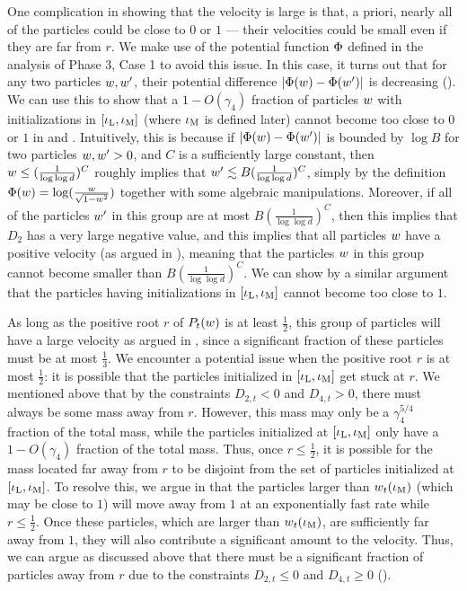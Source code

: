 One complication in showing that the velocity is large is that, a priori, nearly all of the particles could be close to $0$ or $1$ --- their velocities could be small even if they are far from $r$. We make use of the potential function $\Phi$ defined in the analysis of Phase 3, Case 1 to avoid this issue. In this case, it turns out that for any two particles $w, w'$, their potential difference $|\Phi(w) - \Phi(w')|$ is decreasing (). We can use this to show that a $1 - O(\gamma_4)$ fraction of particles $w$ with initializations in $[\iota_{\textup{L}}, \iota_{\textup{M}}]$ (where $\iota_{\textup{M}}$ is defined later) cannot become too close to $0$ or $1$ in  and . Intuitively, this is because if $|\Phi(w) - \Phi(w')|$ is bounded by $\log B$ for two particles $w, w' > 0$, and $C$ is a sufficiently large constant, then $w \leq (\frac{1}{\log \log d})^C$ roughly implies that $w' \lesssim B(\frac{1}{\log \log d})^C$, simply by the definition $\Phi(w) = \log(\frac{w}{\sqrt{1 - w^2}})$ together with some algebraic manipulations. Moreover, if all of the particles $w'$ in this group are at most $B (\frac{1}{\log \log d})^C$, then this implies that $D_2$ has a very large negative value, and this implies that all particles $w$ have a positive velocity (as argued in ), meaning that the particles $w$ in this group cannot become smaller than $B(\frac{1}{\log \log d})^C$. We can show by a similar argument that the particles having initializations in $[\iota_{\textup{L}}, \iota_{\textup{M}}]$ cannot become too close to $1$.

As long as the positive root $r$ of $P_t(w)$ is at least $\frac{1}{2}$, this group of particles will have a large velocity as argued in , since a significant fraction of these particles must be at most $\frac{1}{3}$. We encounter a potential issue when the positive root $r$ is at most $\frac{1}{2}$: it is possible that the particles initialized in $[\iota_{\textup{L}}, \iota_{\textup{M}}]$ get stuck at $r$. We mentioned above that by the constraints $D_{2, t} < 0$ and $D_{4, t} > 0$, there must always be some mass away from $r$. However, this mass may only be a $\gamma_4^{5/4}$ fraction of the total mass, while the particles initialized at $[\iota_{\textup{L}}, \iota_{\textup{M}}]$ only have a $1 - O(\gamma_4)$ fraction of the total mass. Thus, once $r \leq \frac{1}{2}$, it is possible for the mass located far away from $r$ to be disjoint from the set of particles initialized at $[\iota_{\textup{L}}, \iota_{\textup{M}}]$. To resolve this, we argue in  that the particles larger than $w_t(\iota_{\textup{M}})$ (which may be close to $1$) will move away from $1$ at an exponentially fast rate while $r \leq \frac{1}{2}$. Once these particles, which are larger than $w_t(\iota_{\textup{M}})$, are sufficiently far away from $1$, they will also contribute a significant amount to the velocity. Thus, we can argue as discussed above that there must be a significant fraction of particles away from $r$ due to the constraints $D_{2, t} \leq 0$ and $D_{4, t} \geq 0$ ().

